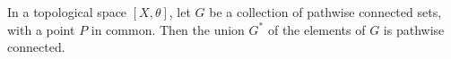 In a topological space $[X, \theta]$, let $G$ be a collection of pathwise connected sets, with a point $P$ in common. Then the union $G^{*}$ of the elements of $G$ is pathwise connected.
